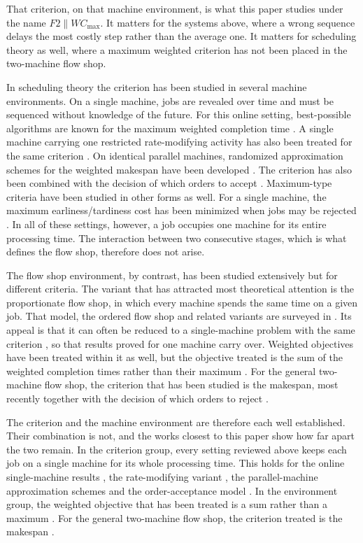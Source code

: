 \documentclass[12pt]{article}
\begin{document}
\begin{sloppypar}
That criterion, on that machine environment, is what this paper studies under the name
$F2 \parallel WC_{\max}$. It matters for the systems above, where a wrong sequence delays
the most costly step rather than the average one. It matters for scheduling theory as well,
where a maximum weighted criterion has not been placed in the two-machine flow shop.

In scheduling theory the criterion has been studied in several machine environments. On a
single machine, jobs are revealed over time and must be sequenced without knowledge of the
future. For this online setting, best-possible algorithms are known for the maximum
weighted completion time \citep{li2015best}. A single machine carrying one restricted
rate-modifying activity has also been treated for the same criterion
\citep{zuo2026single}. On identical parallel machines, randomized approximation schemes for
the weighted makespan have been developed \citep{sun2024randomized}. The criterion has also
been combined with the decision of which orders to accept \citep{lu2025order}.
Maximum-type criteria have been studied in other forms as well. For a single machine, the
maximum earliness/tardiness cost has been minimized when jobs may be rejected
\citep{guo2026maximum}. In all of these settings, however, a job occupies one machine for
its entire processing time. The interaction between two consecutive stages, which is what
defines the flow shop, therefore does not arise.

The flow shop environment, by contrast, has been studied extensively but for different
criteria. The variant that has attracted most theoretical attention is the proportionate
flow shop, in which every machine spends the same time on a given job. That model, the
ordered flow shop and related variants are surveyed in \citep{panwalkar2013review}. Its
appeal is that it can often be reduced to a single-machine problem with the same criterion
\citep{panwalkar2015equivalence}, so that results proved for one machine carry over.
Weighted objectives have been treated within it as well, but the objective treated is
the sum of the weighted completion times rather than their maximum
\citep{shakhlevich1998minimizing}. For the general two-machine flow shop, the criterion
that has been studied is the makespan, most recently together with the decision of which
orders to reject \citep{shabtay2024coordinating}.

The criterion and the machine environment are therefore each well established. Their
combination is not, and the works closest to this paper show how far apart the two remain.
In the criterion group, every setting reviewed above keeps each job on a single
machine for its whole processing time. This holds for the online single-machine results
\citep{li2015best}, the rate-modifying variant \citep{zuo2026single}, the
parallel-machine approximation schemes \citep{sun2024randomized} and the
order-acceptance model \citep{lu2025order}. In the environment group, the weighted
objective that has been treated is a sum rather than a maximum
\citep{shakhlevich1998minimizing}. For the general two-machine flow shop, the criterion
treated is the makespan \citep{shabtay2024coordinating}.


\end{sloppypar}
\end{document}
